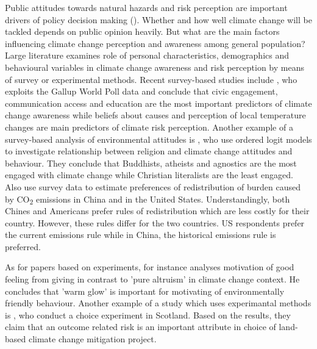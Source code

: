 \documentclass[a4paper,12pt]{article}
\begin{document}
Public attitudes towards natural hazards and risk perception are important drivers of policy decision making (\citealp{BritishColumbia, bookDisastersPrep}). Whether and how well climate change will be tackled depends on public opinion heavily. But what are the main factors influencing climate change perception and awareness among general population? Large literature examines role of personal characteristics, demographics and behavioural variables in climate change awareness and risk perception by means of survey or experimental methods. Recent survey-based studies include \citet{Leiserowitz2015}, who exploits the Gallup World Poll data and conclude that civic engagement, communication access and education are the most important predictors of climate change awareness while beliefs about causes and perception of local temperature changes are main predictors of climate risk perception. Another example of a survey-based analysis of environmental attitudes is \citet{Morrison2015}, who use ordered logit models to investigate relationship between religion and climate change attitudes and behaviour. They conclude that Buddhists, atheists and agnostics are the most engaged with climate change while Christian literalists are the least engaged. Also \citet{Carlsson2013} use survey data to estimate preferences of redistribution of burden caused by CO\textsubscript{$2$} emissions in China and in the United States. Understandingly, both Chines and Americans prefer rules of redistribution which are less costly for their country. However, these rules differ for the two countries. US respondents prefer the current emissions rule while in China, the historical emissions rule is preferred.


As for papers based on experiments, for instance \citet{Braaten2014} analyses motivation of good feeling from giving in contrast to 'pure altruism' in climate change context. He concludes that 'warm glow' is important for motivating of environmentally friendly behaviour. Another example of a study which uses experimantal methods is \citet{GlenkColombo2013}, who conduct a choice experiment in Scotland. Based on the results, they claim that an outcome related risk is an important attribute in choice of land-based climate change mitigation project. 
\end{document}
